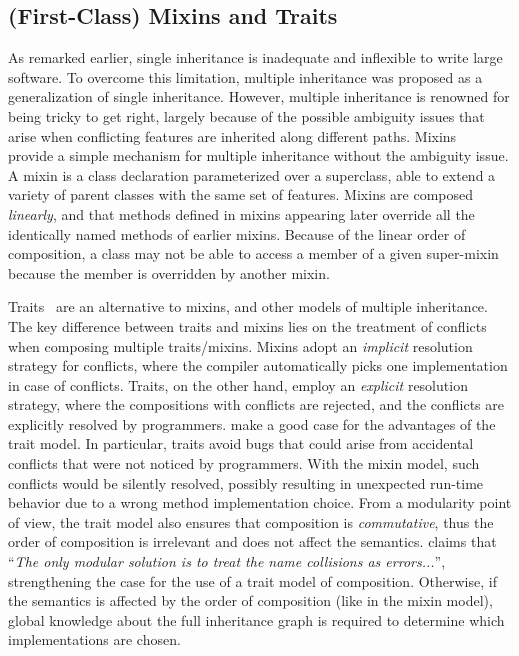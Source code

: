 \subsection{(First-Class) Mixins and Traits}

As remarked earlier, single inheritance is inadequate and inflexible to write
large software. To overcome this limitation, multiple
inheritance was proposed as a generalization of
single inheritance. However, multiple inheritance is renowned for being tricky
to get right, largely because of the possible ambiguity issues that arise when
conflicting features are inherited along different paths.
Mixins~\citep{bracha1990mixin} provide a simple mechanism for multiple
inheritance without the ambiguity issue. A mixin is a class declaration
parameterized over a superclass, able to extend a variety of parent classes with
the same set of features. Mixins are composed \emph{linearly}, and that methods defined
in mixins appearing later override all the identically named methods of earlier
mixins. Because of the linear order of composition, a class may not be able
to access a member of a given super-mixin because the member is overridden by
another mixin.

Traits~\citep{scharli2003traits, Ducasse_2006} are an alternative to mixins, and
other models of multiple inheritance. The key difference between traits and
mixins lies on the treatment of conflicts when composing multiple traits/mixins.
Mixins adopt an \emph{implicit} resolution strategy for conflicts, where the
compiler automatically picks one implementation in case of conflicts. Traits, on
the other hand, employ an \emph{explicit} resolution strategy, where the
compositions with conflicts are rejected, and the conflicts are explicitly
resolved by programmers. \citet{scharli2003traits} make a good case for the
advantages of the trait model. In particular, traits avoid bugs that could arise
from accidental conflicts that were not noticed by programmers. With the mixin
model, such conflicts would be silently resolved, possibly resulting in
unexpected run-time behavior due to a wrong method implementation choice. From a
modularity point of view, the trait model also ensures that composition is
\emph{commutative}, thus the order of composition is irrelevant and does not
affect the semantics. \citet{bracha1992programming} claims that ``\emph{The only
  modular solution is to treat the name collisions as errors...}'',
strengthening the case for the use of a trait model of composition. Otherwise,
if the semantics is affected by the order of composition (like in the mixin model), global knowledge about
the full inheritance graph is required to determine which implementations are
chosen.

